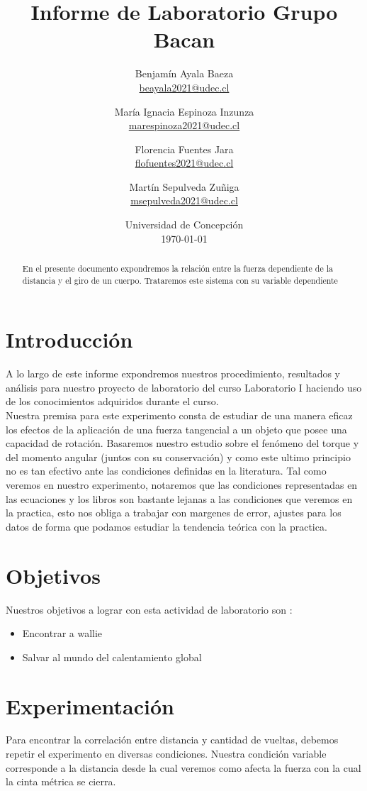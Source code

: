 \documentclass{article}
\title{Informe de Laboratorio Grupo Bacan }
\author{Benjam\'in Ayala Baeza  \\ \href{mailto:beayala2021@udec.cl}{beayala2021@udec.cl} 
        \and Mar\'ia Ignacia Espinoza Inzunza \\ \href{mailto:marespinoza2021@udec.cl}{marespinoza2021@udec.cl} \\
        \and Florencia Fuentes Jara \\ \href{mailto:flofuentes2021@udec.cl}{flofuentes2021@udec.cl} \\
        \and Mart\'in Sepulveda Zu\~niga \\ \href{mailto:msepulveda2021@udec.cl}{msepulveda2021@udec.cl} \\
\date{Universidad de Concepci\'on \\ \today}
}
\begin{document}
\maketitle

\begin{abstract}
En el presente documento expondremos la relación entre la fuerza dependiente de la distancia y el giro de un cuerpo. Trataremos este sistema con su variable dependiente 
\end{abstract}

\section{Introducción} \label{intro}
 A lo largo de este informe expondremos nuestros procedimiento, resultados y análisis para nuestro proyecto de laboratorio del curso Laboratorio I haciendo uso de los conocimientos adquiridos durante el curso.\\
 Nuestra premisa para este experimento consta de estudiar de una manera eficaz los efectos de la aplicación de una fuerza tangencial a un objeto que posee una capacidad de rotación. Basaremos nuestro estudio sobre el fenómeno del torque y del momento angular (juntos con su conservación) y como este ultimo principio no es tan efectivo ante las condiciones definidas en la literatura. Tal como veremos en nuestro experimento, notaremos que las condiciones representadas en las ecuaciones y los libros son bastante lejanas a las condiciones que veremos en la practica, esto nos obliga a trabajar con margenes de error, ajustes para los datos de forma que podamos estudiar la tendencia teórica con la practica. 
\section{Objetivos}
Nuestros objetivos a lograr con esta actividad de laboratorio son :

\begin{itemize}
    \item Encontrar a wallie
    \item Salvar al mundo del calentamiento global 

\end{itemize}

 \section{Experimentación}
Para encontrar la correlación entre distancia y cantidad de vueltas, debemos repetir el experimento en diversas condiciones. Nuestra condición variable corresponde a la distancia desde la cual veremos como afecta la fuerza con la cual la cinta métrica se cierra.
\end{document}

